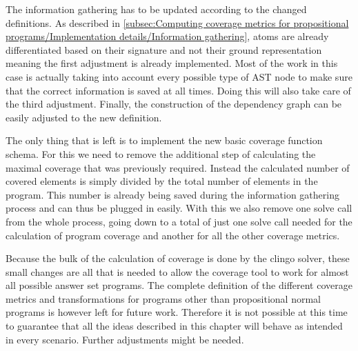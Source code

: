The information gathering has to be updated according to the changed definitions. As described in \cref{subsec:Computing coverage metrics for propositional programs/Implementation details/Information gathering}, atoms are already differentiated based on their signature and not their ground representation meaning the first adjustment is already implemented. Most of the work in this case is actually taking into account every possible type of AST node to make sure that the correct information is saved at all times. Doing this will also take care of the third adjustment. Finally, the construction of the dependency graph can be easily adjusted to the new definition.

The only thing that is left is to implement the new basic coverage function schema. For this we need to remove the additional step of calculating the maximal coverage that was previously required. Instead the calculated number of covered elements is simply divided by the total number of elements in the program. This number is already being saved during the information gathering process and can thus be plugged in easily. With this we also remove one solve call from the whole process, going down to a total of just one solve call needed for the calculation of program coverage and another for all the other coverage metrics.

Because the bulk of the calculation of coverage is done by the clingo solver, these small changes are all that is needed to allow the coverage tool to work for almost all possible answer set programs. The complete definition of the different coverage metrics and transformations for programs other than propositional normal programs is however left for future work. Therefore it is not possible at this time to guarantee that all the ideas described in this chapter will behave as intended in every scenario. Further adjustments might be needed.
 

\begin{comment}
- explain how the transformations I introduced already do basically everything that was proposed in previous section -> go through one by one?

- example?
\end{comment}


